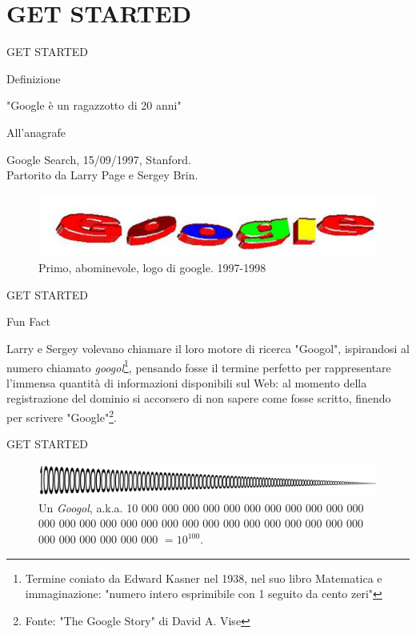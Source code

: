 \documentclass{beamer}
\begin{document}
\section{GET STARTED}
\begin{frame}{GET STARTED}
\begin{block}{\begin{center}Definizione\end{center}}
\begin{center}"Google è un ragazzotto di 20 anni"\end{center}
\end{block}
\begin{block}{\begin{center}All'anagrafe\end{center}}
\begin{center}Google Search, 15/09/1997, Stanford.\\ Partorito da Larry Page e Sergey Brin.\end{center}
\end{block}
\begin{figure}[h!]
\includegraphics[width=0.8\linewidth]{immagini/google11.jpg}
\caption{Primo, abominevole, logo di google. 1997-1998}
\end{figure}
\end{frame}
\begin{frame}{GET STARTED}
\begin{block}{\begin{center}Fun Fact\end{center}}
Larry e Sergey volevano chiamare il loro motore di ricerca "Googol", ispirandosi al numero chiamato \textit{googol}\footnote{Termine coniato da Edward Kasner nel 1938, nel suo libro Matematica e immaginazione: "numero intero esprimibile con 1 seguito da cento zeri"}, pensando fosse il termine perfetto per rappresentare l'immensa quantità di informazioni disponibili sul Web: al momento della registrazione del dominio si accorsero di non sapere come fosse scritto, finendo per scrivere "Google"\footnote{Fonte: "The Google Story" di David A. Vise}.\\
\end{block}
\end{frame}
\begin{frame}{GET STARTED}
\begin{center}
\begin{figure}[h!]
\includegraphics[width=\linewidth]{immagini/Googol.png}
\caption{Un \textit{Googol}, a.k.a. 10 000 000 000 000 000 000 000 000 000 000 000 000 000 000 000 000 000 000 000 000 000 000 000 000 000 000 000 000 000 000 000 000 000 $= 10^{100}$. }
\end{figure}
\end{center}
\end{frame}
\end{document}
